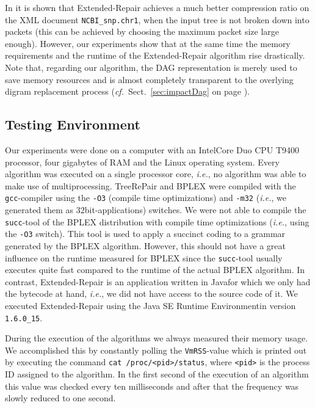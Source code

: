 \documentclass[12pt]{llncs}
\newcommand{\tp}{digram\xspace}
\newcommand{\trp}{\mbox{TreeRePair}\xspace}
\newcommand{\hairsp}{\hspace{1pt}}\newcommand{\TODO}{\textcolor{red}{\bf TODO!}\xspace}
\newcommand{\ie}{\mbox{\textit{i.\hairsp{}e.}}\xspace}
\newcommand{\cf}{\textit{cf.}~}
\begin{document}
In \cite{Krislin08repair} it is shown that Extended-Repair achieves a much better
compression ratio on the XML document \texttt{NCBI\_snp.chr1},
when the input tree is not broken down into packets (this can 
be achieved by choosing the maximum packet size large enough). 
However, our experiments show that at
the same time the memory requirements and the runtime of the
Extended-Repair algorithm rise drastically. Note that, regarding our
algorithm, the DAG representation is merely used to save memory
resources and is almost completely 
transparent to the overlying \tp replacement process 
(\cf Sect.~\ref{sec:impactDag} on page \pageref{sec:impactDag}). 

\subsection{Testing Environment}

Our experiments were done on a computer with an Intel\textregistered\space Core\texttrademark{} Duo CPU T9400 processor, four gigabytes of RAM and the Linux operating system. Every algorithm was executed on a single processor core, \ie, no algorithm was able to make use of multiprocessing. \trp and BPLEX were compiled with the \texttt{gcc}-compiler using the \texttt{-O3} (compile time optimizations) and \texttt{-m32} (\ie, we generated them as 32bit-applications) switches. We were not able to compile the \texttt{succ}-tool of the BPLEX distribution with compile time optimizations (\ie, using the \texttt{-O3} switch). This tool is used to apply a succinct coding to a grammar generated by the BPLEX algorithm.  However, this should not have a great influence on the runtime measured for BPLEX since the \texttt{succ}-tool usually executes quite fast compared to the runtime of the actual BPLEX algorithm. In contrast, Extended-Repair is an application written in Java\texttrademark\space for which we only had the bytecode at hand, \ie, we did not have access to the source code of it. We executed Extended-Repair using the Java SE Runtime Environment\texttrademark\space in version \texttt{1.6.0\_15}.

During the execution of the algorithms we always measured their memory usage. We accomplished this by constantly polling the \texttt{VmRSS}-value which is printed out by executing the command \texttt{cat /proc/<pid>/status}, where \texttt{<pid>} is the process ID assigned to the algorithm. In the first second of the execution of an algorithm this value was checked every ten milliseconds and after that the frequency was slowly reduced to one second.
\end{document}
